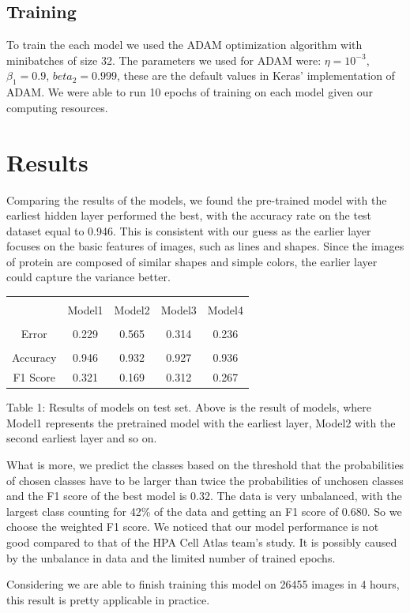 \documentclass{article}
\begin{document}
\subsection{Training}
To train the each model we used the ADAM optimization algorithm with minibatches of size 32.
The parameters we used for ADAM were: $\eta = 10^{-3}$, $\beta_1 = 0.9$, $beta_2=0.999$, these
are the default values in Keras' implementation of ADAM.
We were able to run 10 epochs of training on each model given our computing resources. 
\section{Results}
Comparing the results of the models, we found the pre-trained model with the earliest hidden layer performed the best, with the accuracy rate on the test dataset equal to 0.946. This is consistent with our guess as the earlier layer focuses on the basic features of images, such as lines and shapes. Since the images of protein are composed of similar shapes and simple colors, the earlier layer could capture the variance better. 

\begin{table}[h!]
\centering

\begin{tabular}{|c|c|c|c|c|}
    \hline\\
     &Model1 & Model2&Model3&Model4 \\
     \hline\\
     Error&0.229&0.565&0.314&0.236\\
     \hline\\
     Accuracy&0.946&0.932&0.927&0.936\\
      \hline
     F1 Score&0.321&0.169&0.312&0.267\\
     \hline
\end{tabular}

{\raggedright Table 1: Results of models on test set. Above is the result of models, where Model1 represents the pretrained model with the earliest layer, Model2 with the second earliest layer and so on. \par}

\label{table:1}
\end{table}

What is more, we predict the classes based on the threshold that the probabilities of chosen classes have to be larger than twice the probabilities of unchosen classes and the F1 score of the best model is 0.32. The data is very unbalanced, with the largest class counting for 42\% of the data and getting an F1 score of 0.680. So we choose the weighted F1 score. We noticed that our model performance is not good compared to that of the HPA Cell Atlas team's study. It is possibly caused by the unbalance in data and the limited number of trained epochs.

Considering we are able to finish training this model on 26455 images in 4 hours, this result is pretty applicable in practice.
\end{document}
